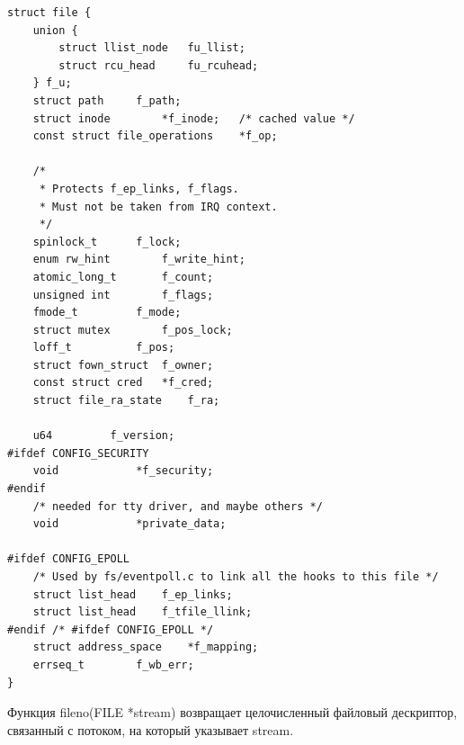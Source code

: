 \documentclass[a4paper,14pt]{extreport} %
\begin{document}
\begin{lstlisting}
struct file {
	union {
		struct llist_node	fu_llist;
		struct rcu_head 	fu_rcuhead;
	} f_u;
	struct path		f_path;
	struct inode		*f_inode;	/* cached value */
	const struct file_operations	*f_op;

	/*
	 * Protects f_ep_links, f_flags.
	 * Must not be taken from IRQ context.
	 */
	spinlock_t		f_lock;
	enum rw_hint		f_write_hint;
	atomic_long_t		f_count;
	unsigned int 		f_flags;
	fmode_t			f_mode;
	struct mutex		f_pos_lock;
	loff_t			f_pos;
	struct fown_struct	f_owner;
	const struct cred	*f_cred;
	struct file_ra_state	f_ra;

	u64			f_version;
#ifdef CONFIG_SECURITY
	void			*f_security;
#endif
	/* needed for tty driver, and maybe others */
	void			*private_data;

#ifdef CONFIG_EPOLL
	/* Used by fs/eventpoll.c to link all the hooks to this file */
	struct list_head	f_ep_links;
	struct list_head	f_tfile_llink;
#endif /* #ifdef CONFIG_EPOLL */
	struct address_space	*f_mapping;
	errseq_t		f_wb_err;
}
\end{lstlisting}

Функция fileno(FILE *stream) возвращает целочисленный файловый дескриптор, связанный с потоком, на который указывает stream.
\end{document}
